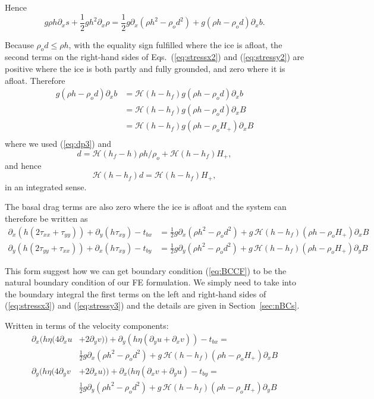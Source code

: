 \documentclass[10pt,a4paper]{book}
\newcommand{\He}{\mathcal{H}}
\newcommand{\p}{\partial}
\newcommand{\tbx}{t_{bx}}
\newcommand{\tby}{t_{by}}
\newcommand{\txx}{\tau_{xx}}
\newcommand{\tyy}{\tau_{yy}}
\newcommand{\txy}{\tau_{xy}}
\begin{document}
Hence
\begin{equation}
 g  \rho h \p_x s + \frac{1}{2} g h^2 \p_x \rho  = \frac{1}{2} g \p_x (\rho h^2 - \rho_o d^2)+g(\rho h -\rho_o d) \p_x b .
\label{eq:gencase}
\end{equation}

Because $\rho_o d \le \rho h$, with the equality sign fulfilled where
the ice is afloat, the second terms on the right-hand sides of
Eqs.~(\ref{eq:stressx2}) and (\ref{eq:stressy2}) are positive where
the ice is both partly and fully grounded, and zero where it is
afloat.  Therefore
\begin{align*} 
g(\rho h -\rho_o d) \p_x b &=  \He(h-h_f) g(\rho h -\rho_o d) \p_x b \\
                          &=  \He(h-h_f) g(\rho h -\rho_o d) \p_x B \\ 
                          &=  \He(h-h_f) g(\rho h -\rho_o H_{+}) \p_x B \\ 
\end{align*}
where we used (\ref{eq:dp3}) and
\[
 d=  \He(h_f-h) \rho h/\rho_o + \He(h-h_f) H_{+} ,
\]
and hence
\[
 \He(h-h_f) d=  \He(h-h_f) H_{+} ,
\]
in an integrated sense.

The basal drag terms are also zero where the ice is afloat and the
system can therefore be written as
\begin{align} 
\p_x ( h ( 2 \txx + \tyy)) +\p_y ( h \txy) -  \tbx
&=\frac{1}{2} g \p_x (\rho h^2 - \rho_o d^2)+ g\,\He(h-h_f) (\rho h -\rho_o H_{+}) \p_x B 
\label{eq:stressx3}\\
\p_y (  h ( 2 \tyy + \txx)) +\p_x ( h \txy ) - \tby
&=\frac{1}{2} g \p_y (\rho h^2 - \rho_o d^2)+g\,\He(h-h_f) (\rho h -\rho_o H_{+}) \p_y B
\label{eq:stressy3}
\end{align}

This form suggest how we can get boundary condition (\ref{eq:BCCF}) to
be the natural boundary condition of our FE formulation. We simply
need to take into the boundary integral the first terms on the left
and right-hand sides of (\ref{eq:stressx3}) and (\ref{eq:stressy3}) and
the details are given in Section~\ref{sec:nBCs}.


Written in terms of the velocity components: 
\begin{align} 
\p_x ( h \eta ( 4 \p_x u &+ 2 \p_y v)) + \p_y ( h \eta (\p_y u + \p_x v) ) - \tbx = \nonumber \\
& \frac{1}{2} g \p_x (\rho h^2 - \rho_o d^2)+ g\,\He(h-h_f) (\rho h -\rho_o H_{+}) \p_x B 
\label{eq:vel3x}\\
\p_y (  h \eta ( 4 \p_y v &+ 2 \p_x u )) +\p_x ( h \eta (\p_x v + \p_y u ) -  \tby = \nonumber \\
& \frac{1}{2} g \p_y (\rho h^2 - \rho_o d^2)+g\,\He(h-h_f) (\rho h -\rho_o H_{+}) \p_y B
\label{eq:vel3y}
\end{align}
\end{document}
